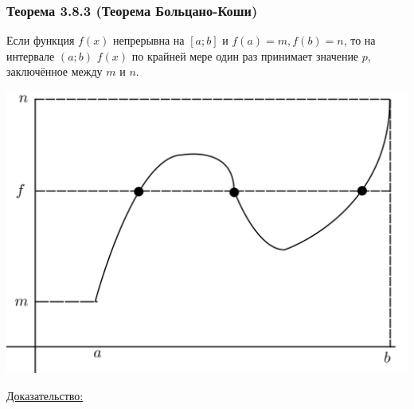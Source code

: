 \documentclass[12pt]{article}
\let\ORIincludegraphics\includegraphics
\renewcommand{\includegraphics}[2][]{\ORIincludegraphics[scale=0.65,#1]{#2}}
\begin{document}
    \subsubsection*{Теорема 3.8.3 (Теорема Больцано-Коши)}\label{th:3.8.3}
    Если функция $f(x)$ непрерывна на $[a; b]$ и $f(a) = m, f(b) = n$, то на интервале $(a; b)$ $f(x)$ по крайней мере один раз принимает значение $p$, заключённое между $m$ и $n$.
    \begin{center}
        \includegraphics[scale=0.4]{3.8.1}
    \end{center}
    \underline{Доказательство:}
\end{document}
